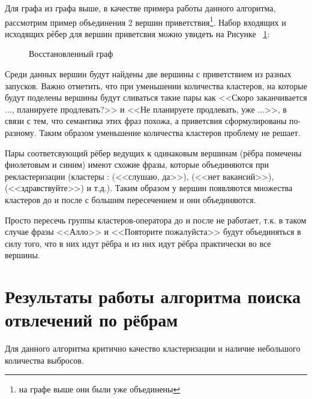\documentclass[times,specification,annotation]{itmo-student-thesis}
\begin{document}
	Для графа из графа выше, в качестве примера работы данного алгоритма, рассмотрим пример объединения 2 вершин приветствия\footnote{на графе выше они были уже объединены}. Набор входящих и исходящих рёбер для вершин приветсвия можно увидеть на Рисунке ~\ref{fig:adapt:graph:merge}:
	
	\begin{figure}[H]
		\caption{Восстановленный граф}
		\label{fig:adapt:graph:merge}
	\end{figure}

	Среди данных вершин будут найдены две вершины с приветствием из разных запусков. Важно отметить, что при уменьшении количества кластеров, на которые будут поделены вершины будут сливаться такие пары как <<Скоро заканчивается ..., планируете продлевать?>> и <<Не планируете продлевать, уже ...>>, в связи с тем, что семантика этих фраз похожа, а приветсвия сформулированы по-разному. Таким образом уменьшение количества кластеров проблему не решает.
	
	Пары соответсвующий рёбер ведущих к одинаковым вершинам (рёбра помечены фиолетовым и синим) имеют схожие фразы, которые объединяются при рекластеризации (кластеры : (<<слушаю, да>>), (<<нет вакансий>>), (<<здравствуйте>>) и т.д.). Таким образом у вершин появляются множества кластеров до и после с большим пересечением и они объединяются.
	
	Просто пересечь группы кластеров-оператора до и после не работает, т.к. в таком случае фразы <<Алло>> и <<Повторите пожалуйста>> будут объединяться в силу того, что в них идут рёбра и из них идут рёбра практически во все вершины.
	
	\section{Результаты работы алгоритма поиска отвлечений по рёбрам}
	Для данного алгоритма критично качество кластеризации и наличие небольшого количества выбросов. 
		
\end{document}
